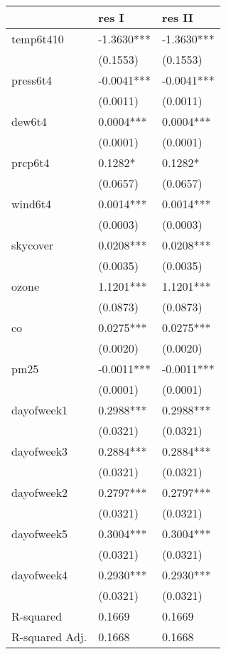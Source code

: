 \documentclass[11pt]{article}
\begin{document}
\begin{table}
	\caption{}
	\label{}
	\begin{center}
		\begin{tabular}{lll}
			\hline
			& res I      & res II      \\
			\hline
			temp6t410      & -1.3630*** & -1.3630***  \\
			& (0.1553)   & (0.1553)    \\
			press6t4       & -0.0041*** & -0.0041***  \\
			& (0.0011)   & (0.0011)    \\
			dew6t4         & 0.0004***  & 0.0004***   \\
			& (0.0001)   & (0.0001)    \\
			prcp6t4        & 0.1282*    & 0.1282*     \\
			& (0.0657)   & (0.0657)    \\
			wind6t4        & 0.0014***  & 0.0014***   \\
			& (0.0003)   & (0.0003)    \\
			skycover       & 0.0208***  & 0.0208***   \\
			& (0.0035)   & (0.0035)    \\
			ozone          & 1.1201***  & 1.1201***   \\
			& (0.0873)   & (0.0873)    \\
			co             & 0.0275***  & 0.0275***   \\
			& (0.0020)   & (0.0020)    \\
			pm25           & -0.0011*** & -0.0011***  \\
			& (0.0001)   & (0.0001)    \\
			dayofweek1     & 0.2988***  & 0.2988***   \\
			& (0.0321)   & (0.0321)    \\
			dayofweek3     & 0.2884***  & 0.2884***   \\
			& (0.0321)   & (0.0321)    \\
			dayofweek2     & 0.2797***  & 0.2797***   \\
			& (0.0321)   & (0.0321)    \\
			dayofweek5     & 0.3004***  & 0.3004***   \\
			& (0.0321)   & (0.0321)    \\
			dayofweek4     & 0.2930***  & 0.2930***   \\
			& (0.0321)   & (0.0321)    \\
			R-squared      & 0.1669     & 0.1669      \\
			R-squared Adj. & 0.1668     & 0.1668      \\
			\hline
		\end{tabular}
	\end{center}
\end{table}
\end{document}
